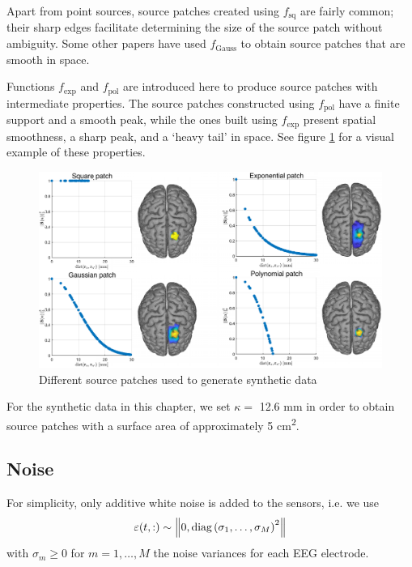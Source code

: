 %
Apart from point sources, source patches created using $f_\text{sq}$ are fairly common; their sharp edges facilitate determining the size of the source patch without ambiguity.
%
Some other papers have used $f_\text{Gauss}$ to obtain source patches that are smooth in space. 

Functions $f_\text{exp}$ and $f_\text{pol}$ are introduced here to produce source patches with intermediate properties.
%
The source patches constructed using $f_\text{pol}$ have a finite support and a smooth peak, while the ones built using $f_\text{exp}$ present spatial smoothness, a sharp peak, and a `heavy tail' in space.
%
See figure \ref{fig:exaple_true} for a visual example of these properties.

\begin{figure}
\centering
\includegraphics[width=\linewidth]{./img/profiles.pdf}
\caption{Different source patches used to generate synthetic data}
\label{fig:exaple_true}
\end{figure}


For the synthetic data in this chapter, we set $\kappa = $ 12.6 \si{mm} in order to obtain source patches with a surface area of approximately 5 \si{cm^2}.

\subsection{Noise}

For simplicity, only additive white noise is added to the sensors, i.e. we use 
\begin{equation}
    \varepsilon(t,:) \sim \left\lVert 0, \text{diag}\left(  \sigma_1, \dots, \sigma_M  \right)^2 \right\rVert
\end{equation}
with $\sigma_m \geq 0$ for $m=1, \dots, M$ the noise variances for each EEG electrode.

